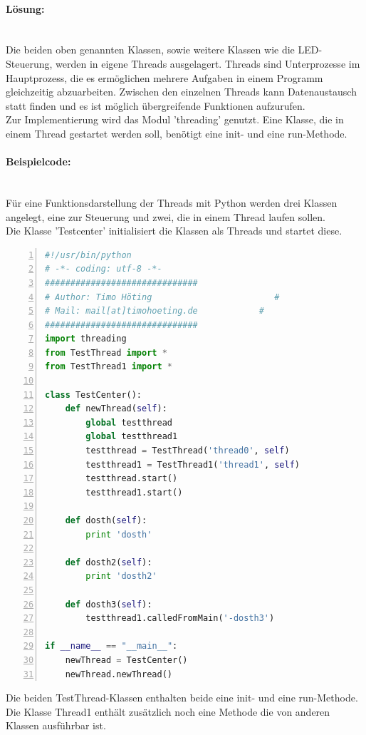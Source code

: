 \paragraph{Lösung:} \\ Die beiden oben genannten Klassen, sowie weitere Klassen wie die LED-Steuerung, werden in eigene Threads ausgelagert. Threads sind Unterprozesse im Hauptprozess, die es ermöglichen mehrere Aufgaben in einem Programm gleichzeitig abzuarbeiten. Zwischen den einzelnen Threads kann Datenaustausch statt finden und es ist möglich übergreifende Funktionen aufzurufen. \\
Zur Implementierung wird das Modul 'threading' genutzt. Eine Klasse, die in einem Thread gestartet werden soll, benötigt eine init- und eine run-Methode.
\paragraph{Beispielcode:}\\
Für eine Funktionsdarstellung der Threads mit Python werden drei Klassen angelegt, eine zur Steuerung und zwei, die in einem Thread laufen sollen. \\
Die Klasse 'Testcenter' initialisiert die Klassen als Threads und startet diese.
\begin{lstlisting}[caption=Klasse Testcenter, language=python, frame=single, breaklines=true,columns=fullflexible, commentstyle=\color{gray}\upshape, captionpos=b, numbers = left]
#!/usr/bin/python
# -*- coding: utf-8 -*-
##############################
# Author: Timo Höting                        #
# Mail: mail[at]timohoeting.de            #
##############################
import threading
from TestThread import *
from TestThread1 import *

class TestCenter():
    def newThread(self):
        global testthread
        global testthread1
        testthread = TestThread('thread0', self)
        testthread1 = TestThread1('thread1', self)
        testthread.start()
        testthread1.start()

    def dosth(self):
        print 'dosth'

    def dosth2(self):
        print 'dosth2'

    def dosth3(self):
        testthread1.calledFromMain('-dosth3')

if __name__ == "__main__":
    newThread = TestCenter()
    newThread.newThread()
\end{lstlisting}
Die beiden TestThread-Klassen enthalten beide eine init- und eine run-Methode. Die Klasse Thread1 enthält zusätzlich noch eine Methode die von anderen Klassen ausführbar ist. 

